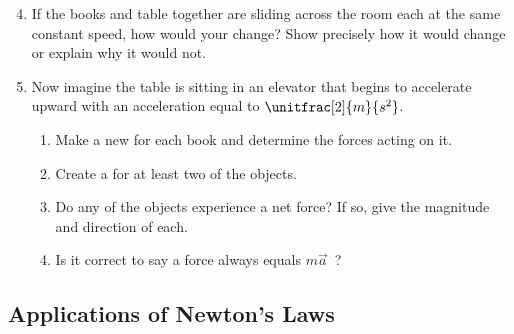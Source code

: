 \begin{enumerate}
	  \setcounter{enumi}{3}
	\item If the books and table together are sliding across the room each at the same constant speed, how would your \forcediags{} change? Show precisely how it would change or explain why it would not.
	
	\item Now imagine the table is sitting in an elevator that begins to accelerate upward with an acceleration equal to $\unitfrac[2]{m}{s^2}$.
	\begin{enumerate}
		\item Make a new \forcediag{} for each book and determine the forces acting on it.
		\item Create a \pchart{} for at least two of the objects.
		\item Do any of the objects experience a net force? If so, give the magnitude and direction of each.
		\item Is it correct to say a force always equals $m\vec{a}$~?
	\end{enumerate}
\end{enumerate}

\WCD

\subsection{Applications of Newton's Laws}

\begin{fnt}
	
\end{fnt}

\vspace{-6pt}
\WCD
\vspace{12pt}

